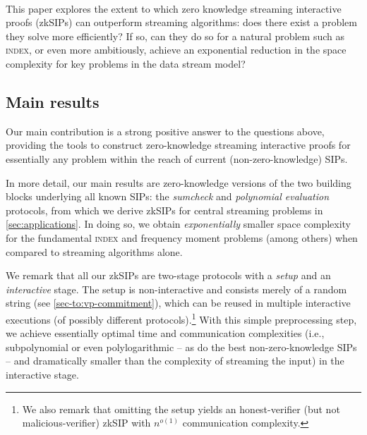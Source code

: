 \documentclass[a4paper,UKenglish,cleveref, autoref, thm-restate]{lipics-v2021}
\theoremstyle{definition}
\newcommand{\zksip}{\textrm{zkSIP}}
\newcommand{\indexproblem}{\normalfont\textsc{index}\xspace}
\begin{document}
\iflipics\else\paragraph*{}\fi This paper explores the extent to which zero knowledge streaming interactive proofs (\zksip{}s) can outperform streaming algorithms: does there exist a problem they solve more efficiently? If so, can they do so for a natural problem such as \indexproblem, or even more ambitiously, achieve an exponential reduction in the space complexity for key problems in the data stream model?



\subsection{Main results}

Our main contribution is a strong positive answer to the questions above, providing the tools to construct zero-knowledge streaming interactive proofs for essentially any problem within the reach of current (non-zero-knowledge) SIPs.

In more detail, our main results are zero-knowledge versions of the two building blocks underlying all known SIPs: the \emph{sumcheck} and \emph{polynomial evaluation} protocols, from which we derive \zksip{}s for central streaming problems in \cref{sec:applications}. In doing so, we obtain \emph{exponentially} smaller space complexity for the fundamental \indexproblem and frequency moment problems (among others) when compared to streaming algorithms alone. %

We remark that all our \zksip{}s are two-stage protocols with a \emph{setup} and an \emph{interactive} stage. The setup is non-interactive and consists merely of a random string (see \cref{sec-to:vp-commitment}), which can be reused in multiple interactive executions (of possibly different protocols).\footnote{We also remark that omitting the setup yields an honest-verifier (but not malicious-verifier) \zksip{} with $n^{o(1)}$ communication complexity.} With this simple preprocessing step, we achieve essentially optimal time and communication complexities (i.e., subpolynomial or even polylogarithmic -- as do the best non-zero-knowledge SIPs -- and dramatically smaller than the complexity of streaming the input) in the interactive stage.
\end{document}
